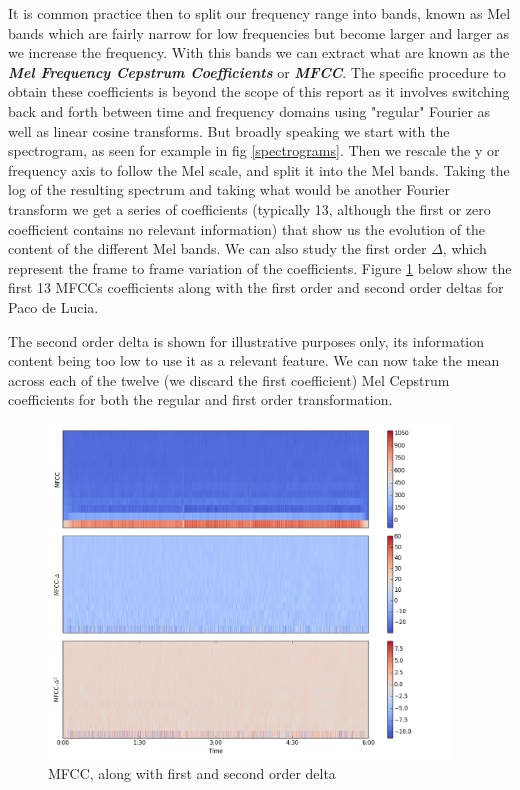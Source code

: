 \documentclass[12pt]{article}
\begin{document}
It is common practice then to split our frequency range into bands, known as Mel bands which are fairly narrow for low frequencies but become larger and larger as we increase the frequency. With this bands we can extract what are known as the \textbf{\textit{Mel Frequency Cepstrum Coefficients }} or \textbf{\textit{MFCC}}. The specific procedure to obtain these coefficients is beyond the scope of this report as it involves switching back and forth between time and frequency domains using "regular" Fourier as well as linear cosine transforms. But broadly speaking we start with the spectrogram, as seen for example in fig \ref{spectrograms}. Then we rescale the y or frequency axis to follow the Mel scale, and split it into the Mel bands. Taking the log of the resulting spectrum and taking what would be another Fourier transform we get a series of coefficients  (typically 13, although the first or zero coefficient contains no relevant information) that show us the evolution of the content of the different Mel bands. We can also study the first order $\Delta$, which represent the frame to frame variation of the coefficients. Figure \ref{mfccs} below show the first 13 MFCCs coefficients along with the first order and second order deltas for Paco de Lucia.

The second order delta is shown for illustrative purposes only, its information content being too low to use it as a relevant feature. We can now take the mean across each of the twelve (we discard the first coefficient) Mel Cepstrum coefficients for both the regular and first order transformation. 
\begin{figure}
\centering
  \includegraphics[width=0.95\textwidth]{MFCCS_Entre_Dos_Aguas.png}
  \caption{MFCC, along with first and second order delta}
  \label{mfccs}
\end{figure}
\end{document}
